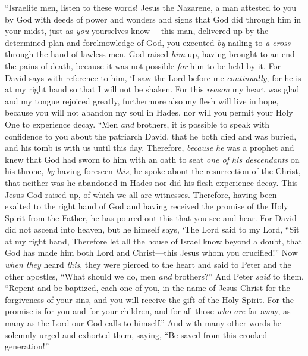 \begin{biblechapter}
\verse “Israelite men, listen to these words! Jesus the Nazarene, a man attested to you by God with deeds of power and wonders and signs that God did through him in your midst, just as \textit{you} yourselves know—
\verse this man, delivered up by the determined plan and foreknowledge of God, you executed \textit{by} nailing to \textit{a cross} through the hand of lawless men.
\verse God raised \textit{him} up, having brought to an end the pains of death, because it was not possible \textit{for} him to be held by it.
\verse For David says with reference to him,
\verse ‘I saw the Lord before me \textit{continually}, 
for he is at my right hand so that I will not be shaken.
\verse For this \textit{reason} my heart was glad 
and my tongue rejoiced greatly, 
furthermore also my flesh will live in hope,
\verse because you will not abandon my soul in Hades, 
nor will you permit your Holy One to experience decay.
\verse “Men \textit{and} brothers, it is possible to speak with confidence to you about the patriarch David, that he both died and was buried, and his tomb is with us until this day.
\verse Therefore, \textit{because he} was a prophet and knew that God had sworn to him with an oath to seat \textit{one of his descendants} on his throne,
\verse \textit{by} having foreseen \textit{this}, he spoke about the resurrection of the Christ, that neither was he abandoned in Hades nor did his flesh experience decay.
\verse This Jesus God raised up, of which we all are witnesses.
\verse Therefore, having been exalted to the right hand of God and having received the promise of the Holy Spirit from the Father, he has poured out this that you see and hear.
\verse For David did not ascend into heaven, but he himself says,
\verse ‘The Lord said to my Lord, 
“Sit at my right hand,
\verse Therefore let all the house of Israel know beyond a doubt, that God has made him both Lord and Christ—this Jesus whom you crucified!”
 Now \textit{when they} heard \textit{this}, they were pierced to the heart and said to Peter and the other apostles, “What should we do, men \textit{and} brothers?”
\verse And Peter \textit{said} to them, “Repent and be baptized, each one of you, in the name of Jesus Christ for the forgiveness of your sins, and you will receive the gift of the Holy Spirit.
\verse For the promise is for you and for your children, and for all those \textit{who are} far away, as many as the Lord our God calls to himself.”
\verse And with many other words he solemnly urged and exhorted them, saying, “Be saved from this crooked generation!”

\end{biblechapter}

